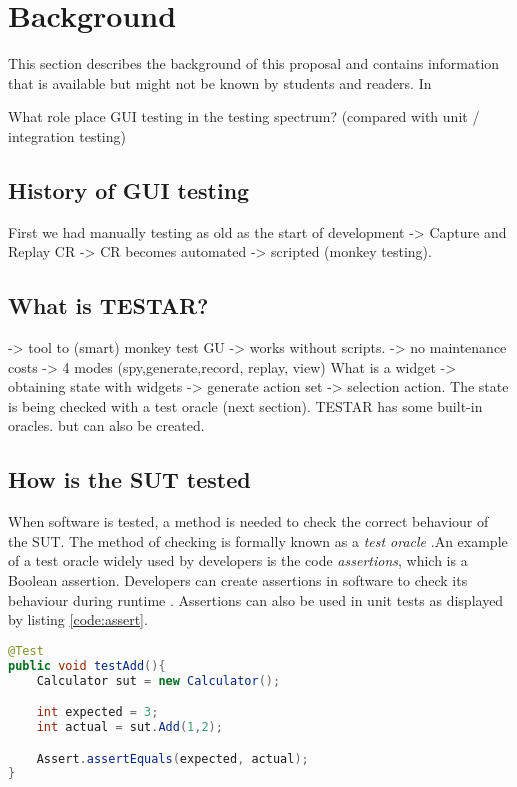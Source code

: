 \section{Background} \label{background}
    This section describes the background of this proposal and contains information that is available but might not be known by students and readers. In
    
    What role place GUI testing in the testing spectrum? (compared with unit / integration testing)

\subsection{History of GUI testing}

    First we had manually testing as old as the start of development -> Capture and Replay CR -> CR becomes automated -> scripted (monkey testing).

\subsection{What is TESTAR?}
    -> tool to (smart) monkey test GU -> works without scripts. -> no maintenance costs -> 4 modes (spy,generate,record, replay, view)
    What is a widget -> obtaining state with widgets -> generate action set -> selection action.
    The state is being checked with a test oracle (next section). TESTAR has some built-in oracles. but can also be created.



\subsection{How is the SUT tested}
    When software is tested, a method is needed to check the correct behaviour of the SUT. The method of checking is formally known as a \emph{test oracle} \cite{testOracles}.An example of a test oracle widely used by developers is the code \emph{assertions}, which is a Boolean assertion. Developers can create assertions in software to check its behaviour during runtime \cite{barr2014oracle}. Assertions can also be used in unit tests as displayed by listing \ref{code:assert}. 

\begin{lstlisting}[language=Java, caption=Assertion, label=code:assert]
@Test
public void testAdd(){
    Calculator sut = new Calculator();

    int expected = 3;
    int actual = sut.Add(1,2);

    Assert.assertEquals(expected, actual);
}
\end{lstlisting}

